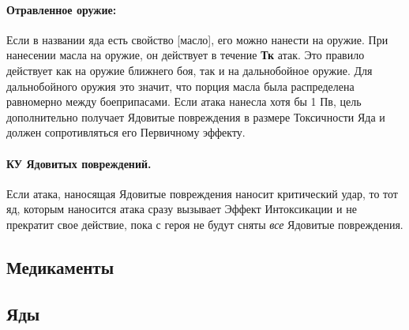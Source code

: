 \paragraph{Отравленное оружие:} Если в названии яда есть свойство [масло], его можно нанести на оружие.
\newline При нанесении масла на оружие, он действует в течение \textbf{Тк} атак. Это правило действует как на оружие ближнего боя, так и на дальнобойное оружие. Для дальнобойного оружия это значит, что порция масла была распределена равномерно между боеприпасами. Если атака нанесла хотя бы 1 Пв, цель дополнительно получает Ядовитые повреждения в размере Токсичности Яда и должен сопротивляться его Первичному эффекту.
\paragraph{КУ Ядовитых повреждений.} Если атака, наносящая Ядовитые повреждения наносит критический удар, то тот яд, которым наносится атака сразу вызывает Эффект Интоксикации и не прекратит свое действие, пока с героя не будут сняты \textit{все} Ядовитые повреждения.

\subsection{Медикаменты}
\subsection{Яды}
\tbd